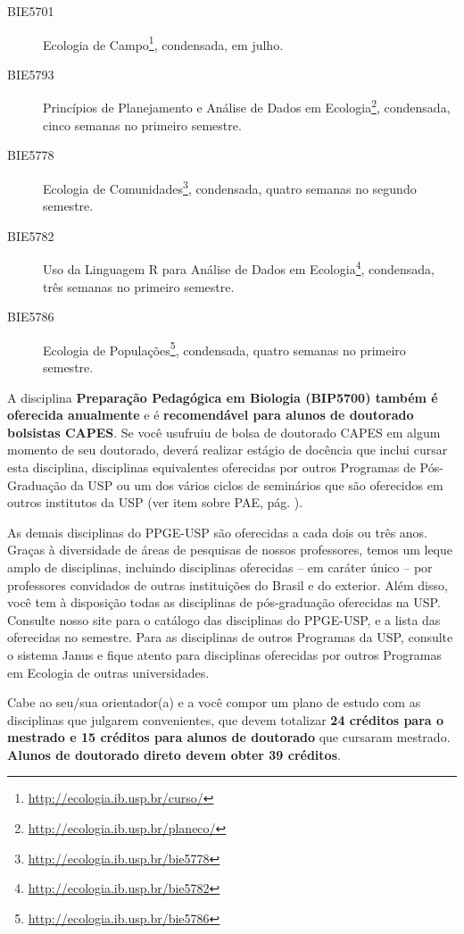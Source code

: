 \documentclass[twoside a4paper 12pt]{report}
\begin{document}
\begin{description}
  \item[BIE5701] Ecologia de Campo\footnote{\url{http://ecologia.ib.usp.br/curso/}}, condensada, em julho.
  \item[BIE5793] Princípios de Planejamento e Análise de Dados em Ecologia\footnote{\url{http://ecologia.ib.usp.br/planeco/}}, condensada, cinco semanas no primeiro semestre.
  \item[BIE5778] Ecologia de Comunidades\footnote{\url{http://ecologia.ib.usp.br/bie5778}}, condensada, quatro semanas no segundo semestre.
  \item[BIE5782] Uso da Linguagem R para Análise de Dados em Ecologia\footnote{\url{http://ecologia.ib.usp.br/bie5782}}, condensada, três semanas no primeiro semestre.
  \item[BIE5786] Ecologia de Populações\footnote{\url{http://ecologia.ib.usp.br/bie5786}}, condensada, quatro semanas no primeiro semestre.
\end{description}

A disciplina \textbf{Preparação Pedagógica em Biologia (BIP5700) também é oferecida anualmente} e é \textbf{recomendável para alunos de doutorado bolsistas CAPES}. Se você usufruiu de bolsa de doutorado CAPES em algum momento de seu doutorado, deverá realizar estágio de docência que inclui cursar esta disciplina, disciplinas equivalentes oferecidas por outros Programas de Pós-Graduação da USP ou um dos vários ciclos de seminários que são oferecidos em outros institutos da USP (ver item sobre PAE, pág. \pageref{subsec:pae}).

As demais disciplinas do PPGE-USP são oferecidas a cada dois ou três anos. Graças à diversidade de áreas de pesquisas de nossos professores, temos um leque amplo de disciplinas, incluindo disciplinas oferecidas -- em caráter único -- por professores convidados de outras instituições do Brasil e do exterior. Além disso, você tem à disposição todas as disciplinas de pós-graduação oferecidas na USP. Consulte nosso site para o catálogo das disciplinas do PPGE-USP, e a lista das oferecidas no semestre. Para as disciplinas de outros Programas da USP, consulte o sistema Janus e fique atento para disciplinas oferecidas por outros Programas em Ecologia de outras universidades.

Cabe ao seu/sua orientador(a) e a você compor um plano de estudo com as disciplinas que julgarem convenientes, que devem totalizar \textbf{24 créditos para o mestrado e 15 créditos para alunos de doutorado} que cursaram mestrado. \textbf{Alunos de doutorado direto devem obter 39 créditos}.
\end{document}
